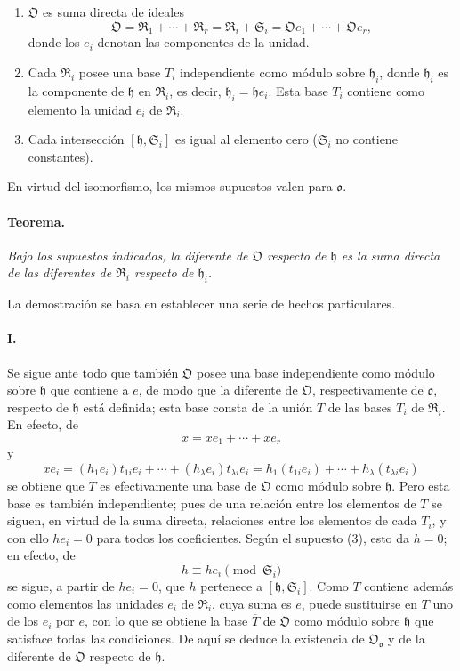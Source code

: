 \begin{enumerate}
\item[(1)] $\mathfrak O$ es suma directa de ideales
\[
\mathfrak O=\mathfrak R_1+\cdots+\mathfrak R_r
=\mathfrak R_i+\mathfrak S_i
=\mathfrak Oe_1+\cdots+\mathfrak Oe_r,
\]
donde los $e_i$ denotan las componentes de la unidad.

\item[(2)] Cada $\mathfrak R_i$ posee una base $T_i$ independiente como módulo sobre $\mathfrak h_i$, donde $\mathfrak h_i$ es la componente de $\mathfrak h$ en $\mathfrak R_i$, es decir, $\mathfrak h_i=\mathfrak h e_i$. Esta base $T_i$ contiene como elemento la unidad $e_i$ de $\mathfrak R_i$.

\item[(3)] Cada intersección $[\mathfrak h,\mathfrak S_i]$ es igual al elemento cero ($\mathfrak S_i$ no contiene constantes).
\end{enumerate}

En virtud del isomorfismo, los mismos supuestos valen para $\mathfrak o$.

\paragraph{Teorema.}
\emph{Bajo los supuestos indicados, la diferente de $\mathfrak O$ respecto de $\mathfrak h$ es la suma directa de las diferentes de $\mathfrak R_i$ respecto de $\mathfrak h_i$.}

La demostración se basa en establecer una serie de hechos particulares.

\paragraph{I.}
Se sigue ante todo que también $\mathfrak O$ posee una base independiente como módulo sobre $\mathfrak h$ que contiene a $e$, de modo que la diferente de $\mathfrak O$, respectivamente de $\mathfrak o$, respecto de $\mathfrak h$ está definida; esta base consta de la unión $T$ de las bases $T_i$ de $\mathfrak R_i$. En efecto, de
\[
x=xe_1+\cdots+xe_r
\]
y
\[
xe_i=(h_1e_i)t_{1i}e_i+\cdots+(h_\lambda e_i)t_{\lambda i}e_i
=h_1(t_{1i}e_i)+\cdots+h_\lambda(t_{\lambda i}e_i)
\]
se obtiene que $T$ es efectivamente una base de $\mathfrak O$ como módulo sobre $\mathfrak h$. Pero esta base es también independiente; pues de una relación entre los elementos de $T$ se siguen, en virtud de la suma directa, relaciones entre los elementos de cada $T_i$, y con ello $h e_i=0$ para todos los coeficientes. Según el supuesto (3), esto da $h=0$; en efecto, de
\[
h\equiv h e_i\pmod{\mathfrak S_i}
\]
se sigue, a partir de $h e_i=0$, que $h$ pertenece a $[\mathfrak h,\mathfrak S_i]$. Como $T$ contiene además como elementos las unidades $e_i$ de $\mathfrak R_i$, cuya suma es $e$, puede sustituirse en $T$ uno de los $e_i$ por $e$, con lo que se obtiene la base $\overline T$ de $\mathfrak O$ como módulo sobre $\mathfrak h$ que satisface todas las condiciones. De aquí se deduce la existencia de $\mathfrak O_{\mathfrak o}$ y de la diferente de $\mathfrak O$ respecto de $\mathfrak h$.

